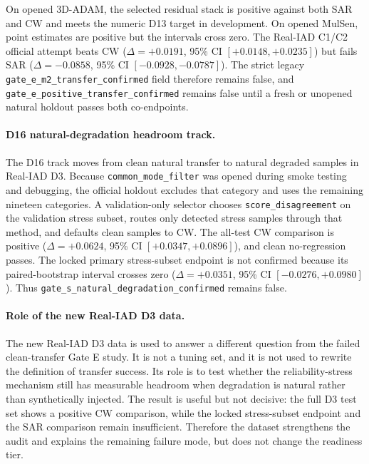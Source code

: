 \documentclass[11pt]{article}
\begin{document}
On opened 3D-ADAM, the selected residual stack is positive against both SAR and
CW and meets the numeric D13 target in development. On opened MulSen, point
estimates are positive but the intervals cross zero. The Real-IAD C1/C2
official attempt beats CW ($\Delta=+0.0191$, 95\% CI $[+0.0148,+0.0235]$) but
fails SAR ($\Delta=-0.0858$, 95\% CI $[-0.0928,-0.0787]$). The strict legacy
\texttt{gate\_e\_m2\_transfer\_confirmed} field therefore remains false, and
\texttt{gate\_e\_positive\_transfer\_confirmed} remains false until a fresh or
unopened natural holdout passes both co-endpoints.

\paragraph{D16 natural-degradation headroom track.}
The D16 track moves from clean natural transfer to natural degraded samples in
Real-IAD D3. Because \texttt{common\_mode\_filter} was opened during smoke
testing and debugging, the official holdout excludes that category and uses the
remaining nineteen categories. A validation-only selector chooses
\texttt{score\_disagreement} on the validation stress subset, routes only
detected stress samples through that method, and defaults clean samples to CW.
The all-test CW comparison is positive ($\Delta=+0.0624$, 95\% CI
$[+0.0347,+0.0896]$), and clean no-regression passes. The locked primary
stress-subset endpoint is not confirmed because its paired-bootstrap interval
crosses zero ($\Delta=+0.0351$, 95\% CI $[-0.0276,+0.0980]$). Thus
\texttt{gate\_s\_natural\_degradation\_confirmed} remains false.

\paragraph{Role of the new Real-IAD D3 data.}
The new Real-IAD D3 data is used to answer a different question from the failed
clean-transfer Gate E study. It is not a tuning set, and it is not used to
rewrite the definition of transfer success. Its role is to test whether the
reliability-stress mechanism still has measurable headroom when degradation is
natural rather than synthetically injected. The result is useful but not
decisive: the full D3 test set shows a positive CW comparison, while the locked
stress-subset endpoint and the SAR comparison remain insufficient. Therefore
the dataset strengthens the audit and explains the remaining failure mode, but
does not change the readiness tier.

\begin{table}[H]
\centering
\caption{D16 Real-IAD D3 natural-degradation audit. The primary endpoint is
the stress subset versus confidence-weighted mean (CW); all-test rows are
supportive only.}
\label{tab:thesis-natural-degradation-d16}
\scriptsize
{}
\end{table}
\end{document}
